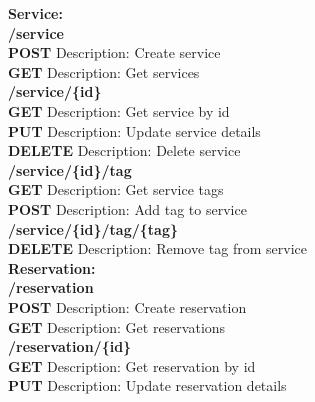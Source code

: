 \documentclass[11pt,a4paper,pdftex]{article}
\begin{document}
\textbf{Service:}\\
\hspace*{1em}\textbf{/service}\\
\hspace*{2em}\textbf{POST} Description: Create service\\
\hspace*{2em}\textbf{GET} Description: Get services\\

\hspace*{1em}\textbf{/service/\{\textbf{id}\}}\\
\hspace*{2em}\textbf{GET} Description: Get service by id\\
\hspace*{2em}\textbf{PUT} Description: Update service details\\
\hspace*{2em}\textbf{DELETE} Description: Delete service\\

\hspace*{1em}\textbf{/service/\{\textbf{id}\}/tag}\\
\hspace*{2em}\textbf{GET} Description: Get service tags\\
\hspace*{2em}\textbf{POST} Description: Add tag to service\\

\hspace*{1em}\textbf{/service/\{\textbf{id}\}/tag/\{\textbf{tag}\}}\\
\hspace*{2em}\textbf{DELETE} Description: Remove tag from service\\



\textbf{Reservation:}\\
\hspace*{1em}\textbf{/reservation}\\
\hspace*{2em}\textbf{POST} Description: Create reservation\\
\hspace*{2em}\textbf{GET} Description: Get reservations\\

\hspace*{1em}\textbf{/reservation/\{\textbf{id}\}}\\
\hspace*{2em}\textbf{GET} Description: Get reservation by id\\
\hspace*{2em}\textbf{PUT} Description: Update reservation details\\
\end{document}
